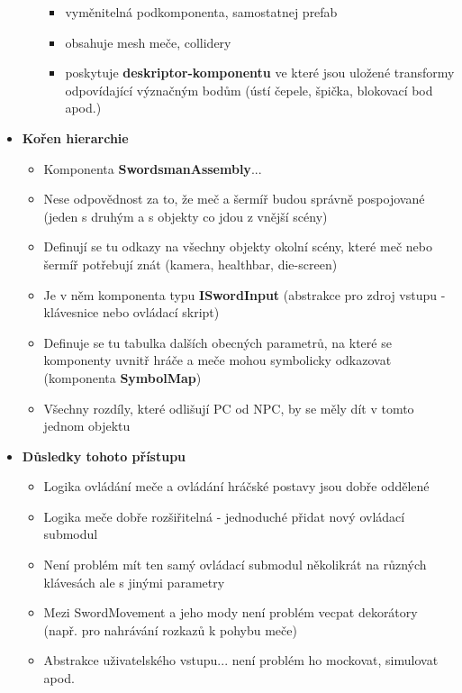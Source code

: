\begin{itemize}
\begin{itemize}
                \begin{itemize}
                    \item vyměnitelná podkomponenta, samostatnej prefab
                    \item obsahuje mesh meče, collidery
                    \item poskytuje \textbf{deskriptor-komponentu} ve které jsou uložené transformy odpovídající význačným bodům (ústí čepele, špička, blokovací bod apod.)
                \end{itemize}
        \end{itemize} 
    \item \textbf{Kořen hierarchie} 
        \begin{itemize}
            \item Komponenta \textbf{SwordsmanAssembly}...
            \item Nese odpovědnost za to, že meč a šermíř budou správně pospojované (jeden s druhým a s objekty co jdou z vnější scény)
            \item Definují se tu odkazy na všechny objekty okolní scény, které meč nebo šermíř potřebují znát (kamera, healthbar, die-screen)
            \item Je v něm komponenta typu \textbf{ISwordInput} (abstrakce pro zdroj vstupu - klávesnice nebo ovládací skript)
            \item Definuje se tu tabulka dalších obecných parametrů, na které se komponenty uvnitř hráče a meče mohou symbolicky odkazovat (komponenta \textbf{SymbolMap})
            \item Všechny rozdíly, které odlišují \acs{PC} od \acs{NPC}, by se měly dít v tomto jednom objektu
        \end{itemize} 
    \item \textbf{Důsledky tohoto přístupu} 
        \begin{itemize}
            \item Logika ovládání meče a ovládání hráčské postavy jsou dobře oddělené
            \item Logika meče dobře rozšiřitelná - jednoduché přidat nový ovládací submodul
            \item Není problém mít ten samý ovládací submodul několikrát na různých klávesách ale s jinými parametry
            \item Mezi SwordMovement a jeho mody není problém vecpat dekorátory (např. pro nahrávání rozkazů k pohybu meče)
            \item Abstrakce uživatelského vstupu... není problém ho mockovat, simulovat apod.

\end{itemize}
\end{itemize}
